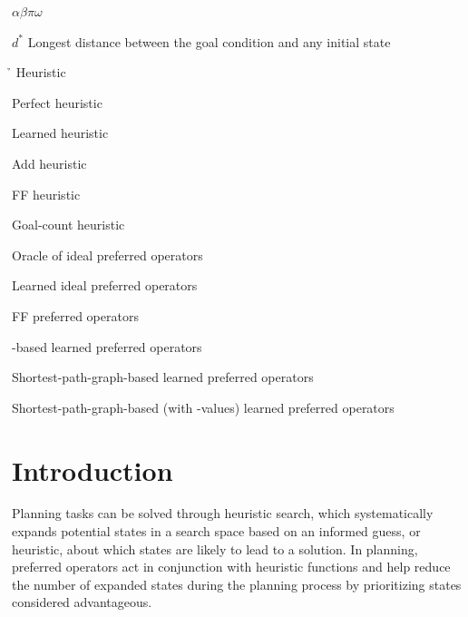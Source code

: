 \documentclass[ppgc,diss,english]{iiufrgs}
\begin{document}
\begin{listofsymbols}{$\alpha\beta\pi\omega$}
       \item[$d^{*}$] Longest distance between the goal condition and any initial state
       \item[\h] Heuristic
       \item[\hstar] Perfect heuristic
       \item[\hnn] Learned heuristic
       \item[\hadd] Add heuristic
       \item[\hff] FF heuristic
       \item[\hgc] Goal-count heuristic
       \item[\postartable] Oracle of ideal preferred operators
       \item[\postar] Learned ideal preferred operators
       \item[\poff] FF preferred operators
       \item[\pofsm] \bfsrw-based learned preferred operators
       \item[\pog] Shortest-path-graph-based learned preferred operators
       \item[\pogstar] Shortest-path-graph-based (with \hstar-values) learned preferred operators
\end{listofsymbols}

\listoffigures

\listoftables

\listofalgorithms

\tableofcontents

%
%
\chapter{Introduction}
\label{cha:introduction}
Planning tasks can be solved through heuristic search, which systematically expands potential states in a search space based on an informed guess, or heuristic, about which states are likely to lead to a solution.
In planning, preferred operators act in conjunction with heuristic functions and help reduce the number of expanded states during the planning process by prioritizing states considered advantageous.
\end{document}
